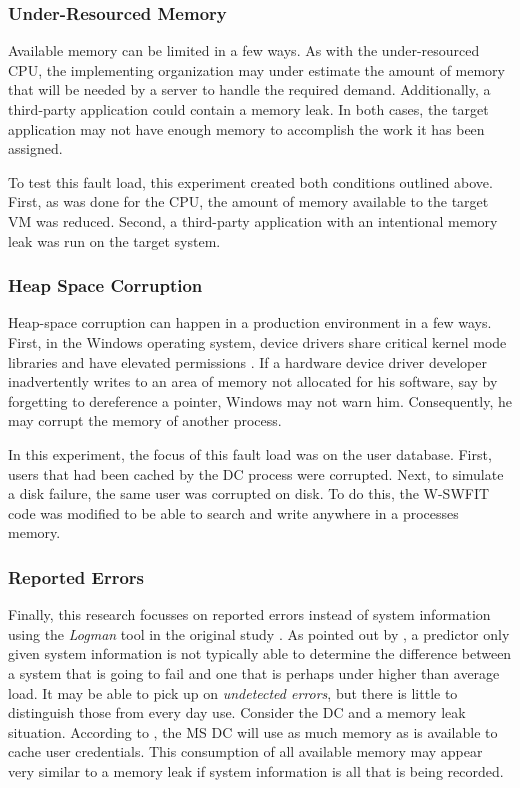 \subsubsection{Under-Resourced Memory} \label{sec:extUnderResourcedMem}
Available memory can be limited in a few ways.  As with the under-resourced
\ac{CPU}, the implementing organization may under estimate the amount of memory
that will be needed by a server to handle the required demand.  Additionally, a
third-party application could contain a memory leak.  In both cases, the target
application may not have enough memory to accomplish the work it has been
assigned.

To test this fault load, this experiment created both conditions outlined
above. First, as was done for the \ac{CPU}, the amount of memory available to
the target \ac{VM} was reduced.  Second, a third-party application with an
intentional memory leak was run on the target system.

\subsubsection{Heap Space Corruption} \label{sec:extHeapSpaceCorrupt}
Heap-space corruption can happen in a production environment in a few ways.
First, in the Windows operating system, device drivers share critical kernel
mode libraries and have elevated permissions \citep{russinovich2009}.  If a
hardware device driver developer inadvertently writes to an area of memory not
allocated for his software, say by forgetting to dereference a pointer, Windows
may not warn him.  Consequently, he may corrupt the memory of another process.

In this experiment, the focus of this fault load was on the user database.
First, users that had been cached by the \ac{DC} process were corrupted.  Next,
to simulate a disk failure, the same user was corrupted on disk.  To do this,
the \ac{W-SWFIT} code was modified to be able to search and write anywhere in a
processes memory.

\subsubsection{Reported Errors} \label{sec:extReportedErrors}
Finally, this research focusses on reported errors instead of system
information using the \emph{Logman} tool in the original study
\citep{irrera2015}.  As pointed out by \citet{salfnerSurvey}, a predictor only
given system information is not typically able to determine the difference
between a system that is going to fail and one that is perhaps under higher
than average load.  It may be able to pick up on \emph{undetected errors}, but
there is little to distinguish those from every day use.  Consider the \ac{DC}
and a memory leak situation.  According to \citet{russinovich2009}, the \ac{MS}
\ac{DC} will use as much memory as is available to cache user credentials.
This consumption of all available memory may appear very similar to a memory
leak if system information is all that is being recorded.
